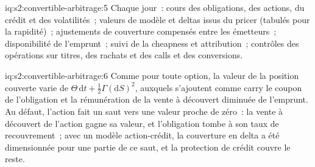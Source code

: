 \begin{solution}{iq:s2:convertible-arbitrage:5}
Chaque jour~: cours des obligations, des actions, du crédit et des volatilités~; valeurs de modèle et deltas issus du pricer (tabulés pour la rapidité)~; ajustements de couverture compensés entre les
émetteurs~; disponibilité de l'emprunt~; suivi de la cheapness et attribution~; contrôles des opérations sur titres, des rachats et des calls et des conversions.
\end{solution}

\begin{solution}{iq:s2:convertible-arbitrage:6}
Comme pour toute option, la valeur de la position couverte varie de $\Theta\,\mathrm{d}t + \tfrac12\Gamma(\mathrm{d}S)^2$, auxquels s'ajoutent comme carry le coupon de l'obligation et la
rémunération de la vente à découvert diminuée de l'emprunt. Au défaut, l'action fait un saut vers une valeur proche de zéro~: la vente à découvert de l'action gagne sa valeur, et l'obligation tombe à son taux de recouvrement~; avec un modèle action-crédit,
la couverture en delta a été dimensionnée pour une partie de ce saut, et la protection de crédit couvre le reste.
\end{solution}
